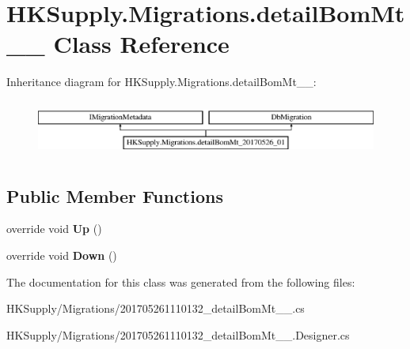 \hypertarget{class_h_k_supply_1_1_migrations_1_1detail_bom_mt__20170526__01}{}\section{H\+K\+Supply.\+Migrations.\+detail\+Bom\+Mt\+\_\+\_ Class Reference}
\label{class_h_k_supply_1_1_migrations_1_1detail_bom_mt__20170526__01}
Inheritance diagram for H\+K\+Supply.\+Migrations.\+detail\+Bom\+Mt\+\_\+\_\+:\begin{figure}[H]
\begin{center}
\leavevmode
\includegraphics[height=1.898305cm]{class_h_k_supply_1_1_migrations_1_1detail_bom_mt__20170526__01}
\end{center}
\end{figure}
\subsection*{Public Member Functions}
\begin{DoxyCompactItemize}
\item 
\mbox{\label{class_h_k_supply_1_1_migrations_1_1detail_bom_mt__20170526__01_ab47fcad699272015a7e0ac85bd6e315a}} 
override void {\bfseries Up} ()
\item 
\mbox{\label{class_h_k_supply_1_1_migrations_1_1detail_bom_mt__20170526__01_ae78bb3207e0acafafc65e3eb76628656}} 
override void {\bfseries Down} ()
\end{DoxyCompactItemize}


The documentation for this class was generated from the following files\+:\begin{DoxyCompactItemize}
\item 
H\+K\+Supply/\+Migrations/201705261110132\+\_\+detail\+Bom\+Mt\+\_\+\_.\+cs\item 
H\+K\+Supply/\+Migrations/201705261110132\+\_\+detail\+Bom\+Mt\+\_\+\_.\+Designer.\+cs\end{DoxyCompactItemize}
